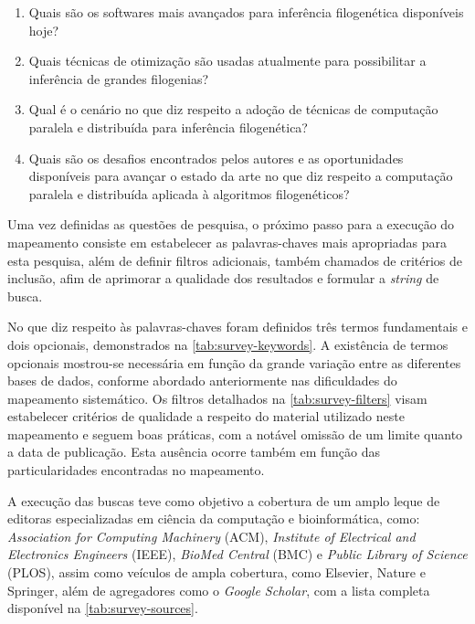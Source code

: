 \documentclass[english,brazilian]{UNISINOSmonografia} %
\begin{document}
\begin{enumerate}[label=Questão~\arabic*:,itemindent=*]
	
	\item Quais são os softwares mais avançados para inferência filogenética disponíveis hoje?
	
	\item Quais técnicas de otimização são usadas atualmente para possibilitar a inferência de grandes filogenias?
	
	\item Qual é o cenário no que diz respeito a adoção de técnicas de computação paralela e distribuída para inferência filogenética?
	
	\item Quais são os desafios encontrados pelos autores e as oportunidades disponíveis para avançar o estado da arte no que diz respeito a computação paralela e distribuída aplicada à algoritmos filogenéticos?
	
\end{enumerate}


Uma vez definidas as questões de pesquisa, o próximo passo para a execução do mapeamento consiste em estabelecer as palavras-chaves mais apropriadas para esta pesquisa, além de definir filtros adicionais, também chamados de critérios de inclusão, afim de aprimorar a qualidade dos resultados e formular a \textit{string} de busca.


No que diz respeito às palavras-chaves foram definidos três termos fundamentais e dois opcionais, demonstrados na \autoref{tab:survey-keywords}.
A existência de termos opcionais mostrou-se necessária em função da grande variação entre as diferentes bases de dados, conforme abordado anteriormente nas dificuldades do mapeamento sistemático.
Os filtros detalhados na \autoref{tab:survey-filters} visam estabelecer critérios de qualidade a respeito do material utilizado neste mapeamento e seguem boas práticas, com a notável omissão de um limite quanto a data de publicação.
Esta ausência ocorre também em função das particularidades encontradas no mapeamento.




A execução das buscas teve como objetivo a cobertura de um amplo leque de editoras especializadas em ciência da computação e bioinformática, como: \textit{Association for Computing Machinery} (ACM), \textit{Institute of Electrical and Electronics Engineers} (IEEE), \textit{BioMed Central} (BMC) e \textit{Public Library of Science} (PLOS), assim como veículos de ampla cobertura, como Elsevier, Nature e Springer, além de agregadores como o \textit{Google Scholar}, com a lista completa disponível na \autoref{tab:survey-sources}.
\end{document}
